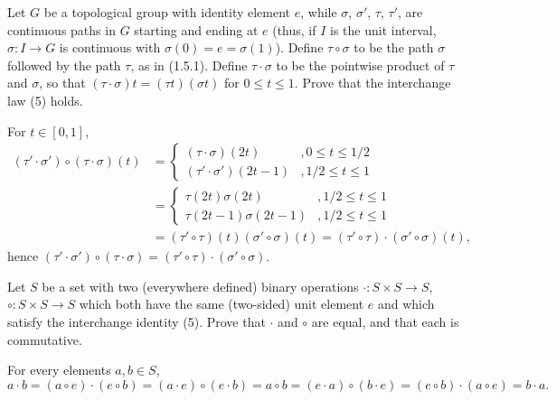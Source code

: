 \begin{exercise}
Let $G$ be a topological group with identity element $e$, while $\sigma$, $\sigma'$, $\tau$, $\tau'$, are continuous paths in $G$ starting and ending at $e$ (thus, if $I$ is the unit interval, $\sigma:I\to G$ is continuous with $\sigma(0)=e=\sigma(1)$). Define $\tau\circ\sigma$ to be the path $\sigma$ followed by the path $\tau$, as in (1.5.1). Define $\tau\cdot\sigma$ to be the pointwise product of $\tau$ and $\sigma$, so that $(\tau\cdot\sigma)t=(\tau t)(\sigma t)$ for $0\leq t\leq 1$. Prove that the interchange law (5) holds.
\end{exercise}
\begin{solution}
For $t\in [0,1]$,
\begin{align*}
(\tau'\cdot\sigma')\circ(\tau\cdot\sigma)(t)&=\begin{cases}(\tau\cdot\sigma)(2t)&,0\leq t\leq 1/2\\(\tau'\cdot\sigma')(2t-1)&,1/2\leq t\leq 1\end{cases}\\
&=\begin{cases}\tau(2t)\sigma(2t)&,1/2\leq t\leq 1\\\tau(2t-1)\sigma(2t-1)&,1/2\leq t\leq 1\end{cases}\\
&=(\tau'\circ\tau)(t)(\sigma'\circ\sigma)(t)=(\tau'\circ\tau)\cdot(\sigma'\circ\sigma)(t),
\end{align*}
hence $(\tau'\cdot\sigma')\circ(\tau\cdot\sigma)=(\tau'\circ\tau)\cdot(\sigma'\circ\sigma)$.
\end{solution}

\begin{exercise}
Let $S$ be a set with two (everywhere defined) binary operations $\cdot:S\times S\to S$, $\circ:S\times S\to S$ which both have the same (two-sided) unit element $e$ and which satisfy the interchange identity (5). Prove that $\cdot$ and $\circ$ are equal, and that each is commutative.
\end{exercise}
\begin{solution}
For every elements $a,b\in S$,
\[a\cdot b=(a\circ e)\cdot (e\circ b)=(a\cdot e)\circ(e\cdot b)=a\circ b=(e\cdot a)\circ (b\cdot e)=(e\circ b)\cdot (a\circ e)=b\cdot a.\]
\end{solution}

